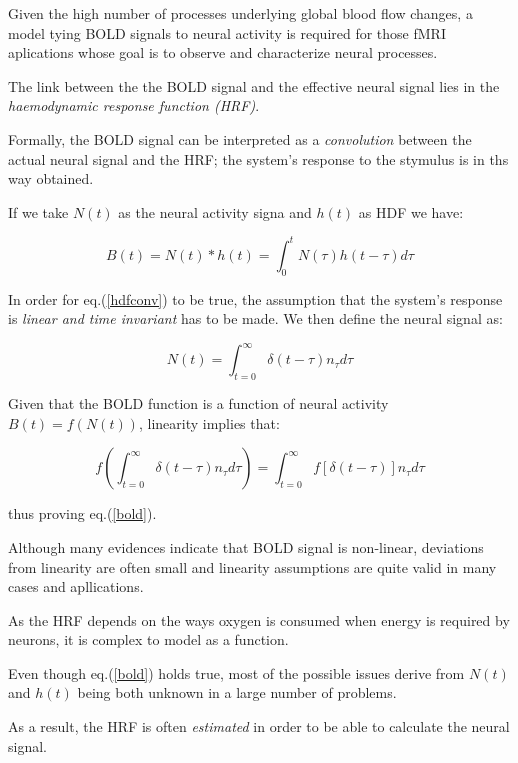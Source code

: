 \documentclass[12pt,openright,twoside,a4paper]{book}
\begin{document}
Given the high number of processes underlying global blood flow changes, a model tying BOLD signals to neural activity is required for those fMRI aplications whose goal is to observe and characterize neural processes.

The link between the the BOLD signal and the effective neural signal lies in the \textit{haemodynamic response function (HRF)}.

Formally, the BOLD signal can be interpreted as a \textit{convolution} between the actual neural signal and the HRF; the system's response to the stymulus is in ths way obtained.

If we take $N(t)$ as the neural activity signa and $h(t)$ as HDF we have:

\begin{equation}
B(t)=N(t)\ast h(t)=\int_0^t N(\tau)h(t-\tau)d\tau
\label{hdfconv}
\end{equation}

In order for eq.(\ref{hdfconv}) to be true, the assumption that the system's response is \textit{linear and time invariant} has to be made. We then define the neural signal as:

\begin{equation}
N(t)=\int_{t=0}^\infty \delta(t-\tau)n_{\tau}d\tau
\end{equation}

Given that the BOLD function is a function of neural activity $B(t) = f(N(t))$, linearity
implies that: 

\begin{equation}
f(\int_{t=0}^\infty \delta(t-\tau)n_{\tau}d\tau)=\int_{t=0}^\infty f[\delta(t-\tau)]n_{\tau}d\tau
\end{equation}

thus proving eq.(\ref{bold}).
\vspace{5mm}

Although many evidences indicate that BOLD signal is non-linear, deviations from linearity are often small and linearity assumptions are quite valid in many cases and apllications.

As the HRF depends on the ways oxygen is consumed when energy is required by neurons, it is complex to model as a function.

Even though eq.(\ref{bold}) holds true, most of the possible issues derive from $N(t)$ and $h(t)$ being both unknown in a large number of problems.

As a result, the HRF is often \textit{estimated} in order to be able to calculate the neural signal.
\end{document}
